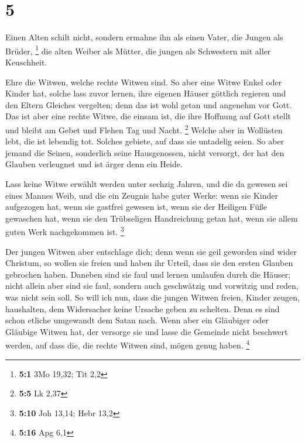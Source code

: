 \hypertarget{section-4}{%
\section{5}\label{section-4}}

 Einen Alten schilt nicht, sondern ermahne ihn als einen
Vater, die Jungen als Brüder, \footnote{\textbf{5:1} 3Mo 19,32; Tit 2,2}
 die alten Weiber als Mütter, die jungen als Schwestern
mit aller Keuschheit.

 Ehre die Witwen, welche rechte Witwen sind.
 So aber eine Witwe Enkel oder Kinder hat, solche lass
zuvor lernen, ihre eigenen Häuser göttlich regieren und den Eltern
Gleiches vergelten; denn das ist wohl getan und angenehm vor Gott.
 Das ist aber eine rechte Witwe, die einsam ist, die ihre
Hoffnung auf Gott stellt und bleibt am Gebet und Flehen Tag und Nacht.
\footnote{\textbf{5:5} Lk 2,37}  Welche aber in Wollüsten
lebt, die ist lebendig tot.  Solches gebiete, auf dass sie
untadelig seien.  So aber jemand die Seinen, sonderlich
seine Hausgenossen, nicht versorgt, der hat den Glauben verleugnet und
ist ärger denn ein Heide.

 Lass keine Witwe erwählt werden unter sechzig Jahren, und
die da gewesen sei eines Mannes Weib,  und die ein
Zeugnis habe guter Werke: wenn sie Kinder aufgezogen hat, wenn sie
gastfrei gewesen ist, wenn sie der Heiligen Füße gewaschen hat, wenn sie
den Trübseligen Handreichung getan hat, wenn sie allem guten Werk
nachgekommen ist. \footnote{\textbf{5:10} Joh 13,14; Hebr 13,2}

 Der jungen Witwen aber entschlage dich; denn wenn sie
geil geworden sind wider Christum, so wollen sie freien 
und haben ihr Urteil, dass sie den ersten Glauben gebrochen haben.
 Daneben sind sie faul und lernen umlaufen durch die
Häuser; nicht allein aber sind sie faul, sondern auch geschwätzig und
vorwitzig und reden, was nicht sein soll.  So will ich
nun, dass die jungen Witwen freien, Kinder zeugen, haushalten, dem
Widersacher keine Ursache geben zu schelten.  Denn es
sind schon etliche umgewandt dem Satan nach.  Wenn aber
ein Gläubiger oder Gläubige Witwen hat, der versorge sie und lasse die
Gemeinde nicht beschwert werden, auf dass die, die rechte Witwen sind,
mögen genug haben. \footnote{\textbf{5:16} Apg 6,1}


